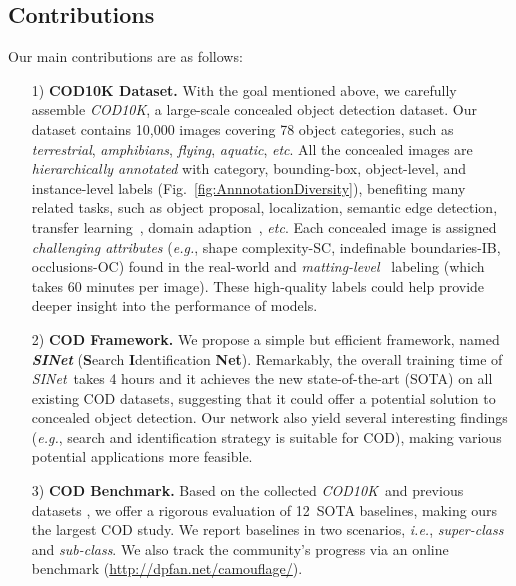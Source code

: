\documentclass[10pt,journal,compsoc]{IEEEtran}
\def\ie{\emph{i.e.}}
\def\eg{\emph{e.g.}}
\def\etc{\emph{etc}}
\newcommand{\sArt}{state-of-the-art }
\newcommand{\figref}[1]{Fig.~\ref{#1}}
\newcommand{\Rev}[1]{\textcolor{black}{#1}}
\def\ourdataset{\textit{COD10K}}
\def\ournewmodel{\emph{SINet}}
\def\baselineN{12}
\begin{document}
\subsection{Contributions}
Our main contributions are as follows:


\begin{itemize}

\item [1)] \textbf{COD10K Dataset.} 
With the goal mentioned above, we carefully assemble \ourdataset, 
a large-scale concealed object detection dataset. 
Our dataset contains 10,000 images covering 78 object categories, such as 
\emph{terrestrial}, \emph{amphibians}, \emph{flying}, \emph{aquatic}, \etc. 
All the concealed images are \emph{hierarchically annotated} with category, 
bounding-box, object-level, 
and instance-level labels (\figref{fig:AnnnotationDiversity}), 
benefiting many related tasks, such as object proposal, localization, 
semantic edge detection, 
transfer learning~\cite{zamir2018taskonomy}, 
domain adaption~\cite{saenko2010adapting}, \etc.
Each concealed image is assigned \emph{challenging attributes} 
(\eg, shape complexity-SC, indefinable boundaries-IB, occlusions-OC) 
found in the real-world and \emph{matting-level}~\cite{zhang2019late} 
labeling (which takes 60 minutes per image).
These high-quality labels could help provide deeper insight into 
the performance of models.

\item [2)] \textbf{COD Framework.} 
We propose a simple but efficient framework, named \textbf{\ournewmodel}
(\textbf{S}earch \textbf{I}dentification \textbf{Net}).
Remarkably, the overall training time of \ournewmodel~takes 4 hours and 
it achieves the new \sArt (SOTA) on all existing COD datasets, suggesting 
that it could offer a potential solution to concealed object detection. 
Our network also yield several interesting findings 
(\eg, search and identification strategy is suitable for COD), 
making various potential applications more feasible. 

\item [3)] \textbf{COD Benchmark.} 
Based on the collected \ourdataset~and previous datasets
\cite{2018Animal,le2019anabranch}, 
we offer a rigorous evaluation of \baselineN~SOTA baselines,
making ours the largest COD study. 
We report baselines in two scenarios, \ie, \textit{super-class} and 
\textit{sub-class}. 
We also track the community's progress via an online benchmark (\Rev{\url{http://dpfan.net/camouflage/}}). 


\end{itemize}
\end{document}
